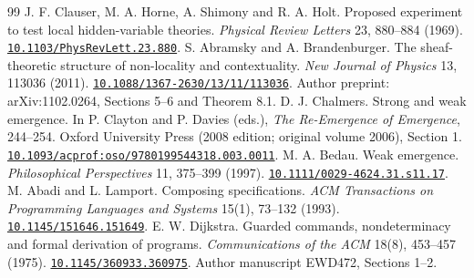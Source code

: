 \documentclass[11pt]{article}
\newcommand{\doi}[1]{\href{https://doi.org/#1}{\nolinkurl{#1}}}
\begin{document}
\begin{thebibliography}{99}
 J. F. Clauser, M. A. Horne, A. Shimony and R. A. Holt. Proposed experiment to test local hidden-variable theories. \emph{Physical Review Letters} 23, 880--884 (1969). \doi{10.1103/PhysRevLett.23.880}.
 S. Abramsky and A. Brandenburger. The sheaf-theoretic structure of non-locality and contextuality. \emph{New Journal of Physics} 13, 113036 (2011). \doi{10.1088/1367-2630/13/11/113036}. Author preprint: arXiv:1102.0264, Sections 5--6 and Theorem 8.1.
 D. J. Chalmers. Strong and weak emergence. In P. Clayton and P. Davies (eds.), \emph{The Re-Emergence of Emergence}, 244--254. Oxford University Press (2008 edition; original volume 2006), Section 1. \doi{10.1093/acprof:oso/9780199544318.003.0011}.
 M. A. Bedau. Weak emergence. \emph{Philosophical Perspectives} 11, 375--399 (1997). \doi{10.1111/0029-4624.31.s11.17}.
 M. Abadi and L. Lamport. Composing specifications. \emph{ACM Transactions on Programming Languages and Systems} 15(1), 73--132 (1993). \doi{10.1145/151646.151649}.
 E. W. Dijkstra. Guarded commands, nondeterminacy and formal derivation of programs. \emph{Communications of the ACM} 18(8), 453--457 (1975). \doi{10.1145/360933.360975}. Author manuscript EWD472, Sections 1--2.
\end{thebibliography}
\end{document}
